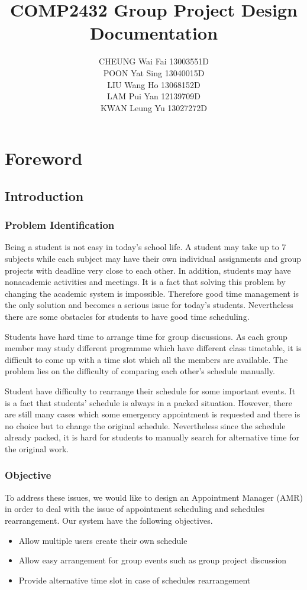 \documentclass[12pt,a4paper]{report}
\author{
CHEUNG Wai Fai 13003551D\\
POON Yat Sing 13040015D\\
LIU Wang Ho 13068152D \\
LAM Pui Yan 12139709D \\
KWAN Leung Yu 13027272D
}
\title{COMP2432 Group Project Design Documentation}
\begin{document}
\maketitle
\tableofcontents
\chapter{Foreword}
\section{Introduction}
\subsection{Problem Identification}
Being a student is not easy in today’s school life. A student may take up to 7 subjects while each subject may have their own individual assignments and group projects with deadline very close to each other. In addition, students may have nonacademic activities and meetings. It is a fact that solving this problem by changing the academic system is impossible. Therefore good time management is the only solution and becomes a serious issue for today’s students. Nevertheless there are some obstacles for students to have good time scheduling.

Students have hard time to arrange time for group discussions. As each group member may study different programme which have different class timetable, it is difficult to come up with a time slot which all the members are available. The problem lies on the difficulty of comparing each other’s schedule manually.

Student have difficulty to rearrange their schedule for some important events. It is a fact that students’ schedule is always in a packed situation. However, there are still many cases which some emergency appointment is requested and there is no choice but to change the original schedule. Nevertheless since the schedule already packed, it is hard for students to manually search for alternative time for the original work.
\subsection{Objective}
To address these issues, we would like to design an Appointment Manager (AMR) in order to deal with the issue of appointment scheduling and schedules rearrangement. Our system have the following objectives.
\begin{itemize}
\item Allow multiple users create their own schedule
\item Allow easy arrangement for group events such as group project discussion
\item Provide alternative time slot in case of schedules rearrangement
\end{itemize}
\end{document}
